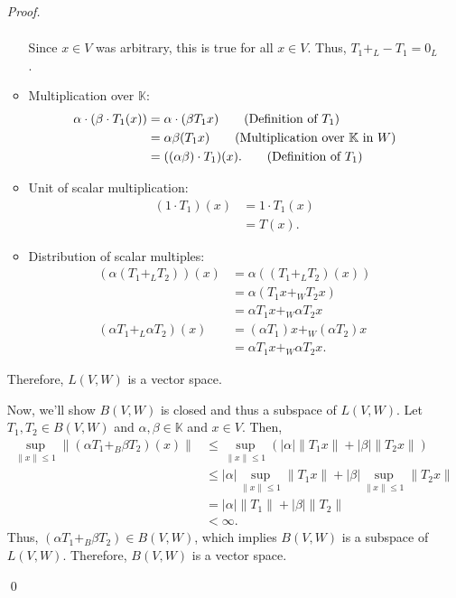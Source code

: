 \documentclass[12pt]{article}
\newenvironment{problem}[2][Problem]{\begin{trivlist}
\item[\hskip \labelsep {\bfseries #1}\hskip \labelsep {\bfseries
#2.}]}{\end{trivlist}}
\newenvironment{sol}
    {\emph{Proof.}
    }
    {
    \qed
    }
\begin{document}
\begin{problem}{4}
\begin{itemize}
\begin{sol}
\begin{itemize}
\begin{align*}
    \end{align*}
    Since $x \in V$ was arbitrary, this is true for all $x \in V$. Thus, $T_1 +_L -T_1 = 0_L$.
    \item[(5)] Multiplication over $\mathbb{K}$: \begin{align*}
        \alpha \cdot (\beta \cdot T_1 (x)) &= \alpha \cdot (\beta T_1x) \tag*{(Definition of $T_1$)} \\ &= \alpha \beta (T_1x) \tag*{(Multiplication over $\mathbb{K}$ in $W$)} \\ &= ((\alpha \beta ) \cdot T_1)(x). \tag*{(Definition of $T_1$)}
    \end{align*}
    \item[(6)] Unit of scalar multiplication: \begin{align*}
        (1 \cdot T_1)(x) &= 1 \cdot T_1(x) \tag*{(Linearity of scalar multiplication)} \\ &= T(x). \tag*{(Definition of 1)}
    \end{align*}
    \item[(7)] Distribution of scalar multiples: \begin{align*}
        (\alpha(T_1 +_L T_2))(x) &= \alpha((T_1 +_L T_2)(x)) \tag*{(Linearity of scalar multiplication)} \\ &= \alpha (T_1x +_W T_2x) \tag*{(Addition on $L(V,W)$)} \\ &= \alpha T_1x +_W \alpha T_2x \tag*{(Distribution of scalar multiples on $W$)} \\ (\alpha T_1 +_L \alpha T_2)(x) &= (\alpha T_1)x +_W (\alpha T_2)x \tag*{(Addition on $L(V,W)$)} \\ &= \alpha T_1x +_W \alpha T_2x. \tag*{(Scalar multiplication on $L(V,W)$)}
    \end{align*}
\end{itemize} 
Therefore, $L(V,W)$ is a vector space. 

\hspace{1em} Now, we'll show $B(V,W)$ is closed and thus a subspace of $L(V,W)$. Let $T_1, T_2 \in B(V,W)$ and $\alpha, \beta \in \mathbb{K}$ and $x \in V$. Then, \begin{align*}
    \sup_{\lVert x \rVert \leq 1} \lVert (\alpha T_1 +_B \beta T_2)(x) \rVert &\leq \sup_{\lVert x \rVert \leq 1} (\left| \alpha \right| \lVert T_1x \rVert + \left| \beta \right| \lVert T_2x \rVert) \tag*{(By triangle inequality)} \\ &\leq \left| \alpha \right| \sup_{\lVert x \rVert \leq 1} \lVert T_1x \rVert + \left| \beta \right| \sup_{\lVert x \rVert \leq 1} \lVert T_2x \rVert \tag*{(Definition of supremum)} \\ &= \left| \alpha \right| \lVert T_1 \rVert + \left| \beta \right| \lVert T_2 \rVert \tag*{(Definition of $\lVert T_1 \rVert$ and $\lVert T_2 \rVert$)} \\ &< \infty.
\end{align*}
Thus, $(\alpha T_1 +_B \beta T_2) \in B(V,W)$, which implies $B(V,W)$ is a subspace of $L(V,W)$. Therefore, $B(V,W)$ is a vector space.
\end{sol}


\end{itemize}
\end{problem}
\end{document}
